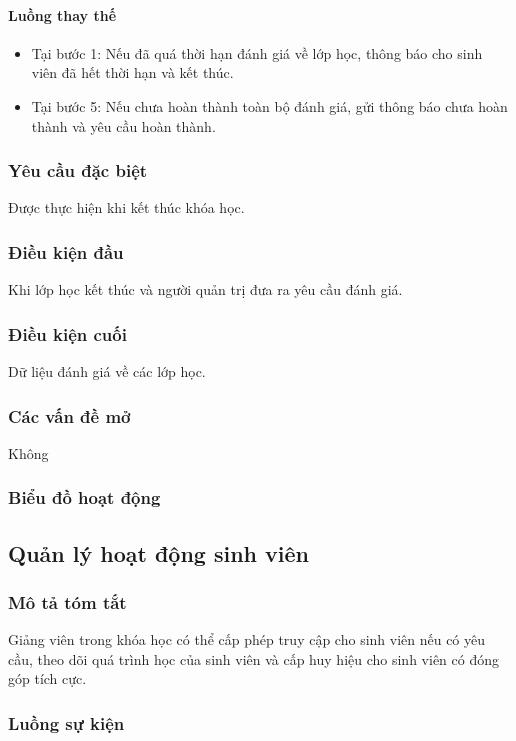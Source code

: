 \documentclass[./../main_file.tex]{subfiles}
\begin{document}
\paragraph{Luồng thay thế}
\begin{itemize}
	\item Tại bước 1: Nếu đã quá thời hạn đánh giá về lớp học, thông báo cho sinh viên đã hết thời hạn và kết thúc.
	\item Tại bước 5: Nếu chưa hoàn thành toàn bộ đánh giá, gửi thông báo chưa hoàn thành và yêu cầu hoàn thành.
	
\end{itemize}
\subsubsection{Yêu cầu đặc biệt}
Được thực hiện khi kết thúc khóa học.

\subsubsection{Điều kiện đầu}
Khi lớp học kết thúc và người quản trị đưa ra yêu cầu đánh giá.

\subsubsection{Điều kiện cuối}
Dữ liệu đánh giá về các lớp học.

\subsubsection{Các vấn đề mở}
Không

\subsubsection{Biểu đồ hoạt động}

\subsection{Quản lý hoạt động sinh viên}
\subsubsection{Mô tả tóm tắt}
Giảng viên trong khóa học có thể cấp phép truy cập cho sinh viên nếu có yêu cầu, theo dõi quá trình học của sinh viên và cấp huy hiệu cho sinh viên có đóng góp tích cực.

\subsubsection{Luồng sự kiện}
\end{document}
